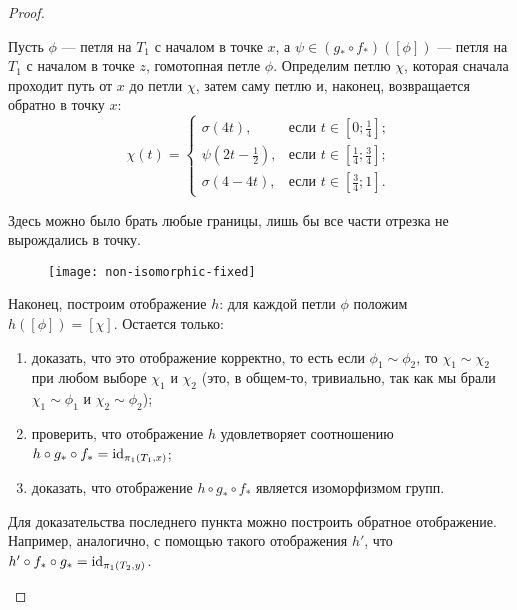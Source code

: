 \documentclass[main]{subfiles}
\begin{document}
\begin{proof}
\begin{phased}
			Пусть $ \phi $ --- петля на $ T_1 $ с началом в точке $ x $, а $ \psi \in (g_* \circ f_*)([\phi]) $ ---
			петля на $ T_1 $ с началом в точке $ z $, гомотопная петле $ \phi $. Определим петлю $ \chi $,
			которая сначала проходит путь от $ x $ до петли $ \chi $, затем саму петлю и, наконец,
			возвращается обратно в точку $ x $:
				\[ \chi(t) = \begin{cases}
						\sigma(4 t),
							& \text{если } t \in \left[ 0; \frac{1}{4} \right]; \\
						\psi\left(2 t - \frac{1}{2}\right),
							& \text{если } t \in \left[ \frac{1}{4}; \frac{3}{4} \right]; \\
						\sigma(4-4 t),
							& \text{если } t \in \left[ \frac{3}{4}; 1 \right].
					\end{cases}
				\]
			\begin{remark}
				Здесь можно было брать любые границы, лишь бы все части отрезка не вырождались в точку.
			\end{remark}
			\begin{figure}[H]
				\centering \texttt{[image: non-isomorphic-fixed]}
			\end{figure}
			Наконец, построим отображение $ h $: для каждой петли $ \phi $ положим
			$ h([\phi]) = [\chi] $. Остается только:
			\begin{enumerate}
				\item доказать, что это отображение корректно, то есть если $ \phi_1 \sim \phi_2 $,
					то $ \chi_1 \sim \chi_2 $ при любом выборе $ \chi_1 $ и $ \chi_2 $ (это, в общем-то, тривиально,
					так как мы брали $ \chi_1 \sim \phi_1 $ и $ \chi_2 \sim \phi_2 $);
				\item проверить, что отображение $ h $ удовлетворяет соотношению
					$ h \circ g_* \circ f_* = \operatorname{id}_{\pi_1(T_1, x)} $;
				\item доказать, что отображение $ h \circ g_* \circ f_* $ является изоморфизмом групп.
			\end{enumerate}
			Для доказательства последнего пункта можно  построить обратное отображение. Например, аналогично, с
			помощью такого отображения $ h' $, что $ h' \circ f_* \circ g_* = \operatorname{id}_{\pi_1(T_2, y)} $.
	\end{phased}
\end{proof}
\end{document}

